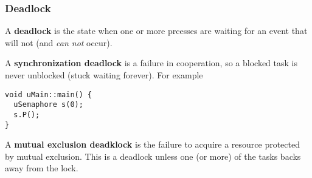 \documentclass[12pt]{article}
\begin{document}
\subsubsection{Deadlock}
A {\bf deadlock} is the state when one or more prcesses are waiting for an event that will not (and \textit{can not} occur).

A {\bf synchronization deadlock} is a failure in cooperation, so a blocked task is never unblocked (stuck waiting forever). For example
\begin{verbatim}
void uMain::main() {
  uSemaphore s(0);
  s.P();
}
\end{verbatim}

A {\bf mutual exclusion deadklock} is the failure to acquire a resource protected by mutual exclusion. This is a deadlock unless one (or more) of the tasks backs away from the lock.
\end{document}
